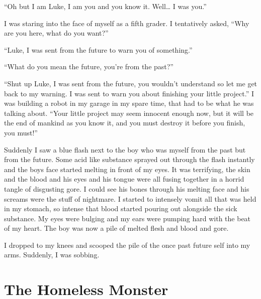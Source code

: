 ``Oh but I am Luke, I am you and you know it. Well{\ldots} I
was you.''



I was staring into the face of myself as a fifth grader. I
tentatively asked, ``Why are you here, what do you
want?''



``Luke, I was sent from the future to warn you of
something.''



``What do you mean the future, you're from the
past?''



``Shut up Luke, I was sent from the future, you wouldn't
understand so let me get back to my warning. I was sent to warn you
about finishing your little project.'' I was building a robot
in my garage in my spare time, that had to be what he was talking
about. ``Your little project may seem innocent enough now, but
it will be the end of mankind as you know it, and you must destroy
it before you finish, you must!''



Suddenly I saw a blue flash next to the boy who was myself from the
past but from the future. Some acid like substance sprayed out
through the flash instantly and the boys face started melting in
front of my eyes. It was terrifying, the skin and the blood and his
eyes and his tongue were all fusing together in a horrid tangle of
disgusting gore. I could see his bones through his melting face and
his screams were the stuff of nightmare. I started to intensely
vomit all that was held in my stomach, so intense that blood
started pouring out alongside the sick substance. My eyes were
bulging and my ears were pumping hard with the beat of my heart.
The boy was now a pile of melted flesh and blood and gore.

I dropped to my knees and scooped the pile of the once past future
self into my arms. Suddenly, I was sobbing. 

 



\chapter{The Homeless Monster}





